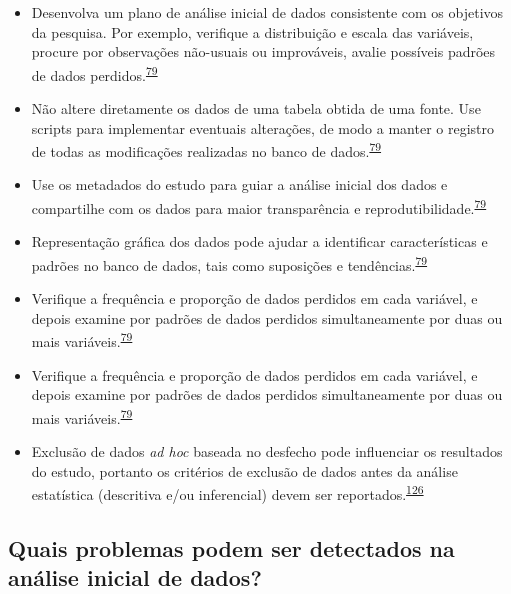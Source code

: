 \documentclass[
  a4paper,
]{book}
\begin{document}
\begin{itemize}
\item
  Desenvolva um plano de análise inicial de dados consistente com os objetivos da pesquisa. Por exemplo, verifique a distribuição e escala das variáveis, procure por observações não-usuais ou improváveis, avalie possíveis padrões de dados perdidos.\textsuperscript{\protect\hyperlink{ref-Baillie2022}{79}}
\item
  Não altere diretamente os dados de uma tabela obtida de uma fonte. Use scripts para implementar eventuais alterações, de modo a manter o registro de todas as modificações realizadas no banco de dados.\textsuperscript{\protect\hyperlink{ref-Baillie2022}{79}}
\item
  Use os metadados do estudo para guiar a análise inicial dos dados e compartilhe com os dados para maior transparência e reprodutibilidade.\textsuperscript{\protect\hyperlink{ref-Baillie2022}{79}}
\item
  Representação gráfica dos dados pode ajudar a identificar características e padrões no banco de dados, tais como suposições e tendências.\textsuperscript{\protect\hyperlink{ref-Baillie2022}{79}}
\item
  Verifique a frequência e proporção de dados perdidos em cada variável, e depois examine por padrões de dados perdidos simultaneamente por duas ou mais variáveis.\textsuperscript{\protect\hyperlink{ref-Baillie2022}{79}}
\item
  Verifique a frequência e proporção de dados perdidos em cada variável, e depois examine por padrões de dados perdidos simultaneamente por duas ou mais variáveis.\textsuperscript{\protect\hyperlink{ref-Baillie2022}{79}}
\item
  Exclusão de dados \emph{ad hoc} baseada no desfecho pode influenciar os resultados do estudo, portanto os critérios de exclusão de dados antes da análise estatística (descritiva e/ou inferencial) devem ser reportados.\textsuperscript{\protect\hyperlink{ref-Landis2012}{126}}
\end{itemize}

\hypertarget{quais-problemas-podem-ser-detectados-na-anuxe1lise-inicial-de-dados}{%
\subsection{Quais problemas podem ser detectados na análise inicial de dados?}\label{quais-problemas-podem-ser-detectados-na-anuxe1lise-inicial-de-dados}}
\end{document}
